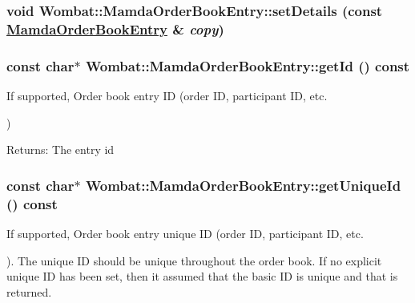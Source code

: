\hypertarget{classWombat_1_1MamdaOrderBookEntry_a0ba36b1717312d26696ef172ed2dd8b}{
\subsubsection[setDetails]{\setlength{\rightskip}{0pt plus 5cm}void Wombat::Mamda\-Order\-Book\-Entry::set\-Details (const \hyperlink{classWombat_1_1MamdaOrderBookEntry}{Mamda\-Order\-Book\-Entry} \& {\em copy})}}
\label{classWombat_1_1MamdaOrderBookEntry_a0ba36b1717312d26696ef172ed2dd8b}


\hypertarget{classWombat_1_1MamdaOrderBookEntry_1c02f6be28f007199af0108f96c829c8}{
\subsubsection[getId]{\setlength{\rightskip}{0pt plus 5cm}const char$\ast$ Wombat::Mamda\-Order\-Book\-Entry::get\-Id () const}}
\label{classWombat_1_1MamdaOrderBookEntry_1c02f6be28f007199af0108f96c829c8}


If supported, Order book entry ID (order ID, participant ID, etc. 

)

\begin{Desc}
\item[Returns:]The entry id \end{Desc}
\hypertarget{classWombat_1_1MamdaOrderBookEntry_8957ccfa3dbebb3da96905becc584220}{
\subsubsection[getUniqueId]{\setlength{\rightskip}{0pt plus 5cm}const char$\ast$ Wombat::Mamda\-Order\-Book\-Entry::get\-Unique\-Id () const}}
\label{classWombat_1_1MamdaOrderBookEntry_8957ccfa3dbebb3da96905becc584220}


If supported, Order book entry unique ID (order ID, participant ID, etc. 

). The unique ID should be unique throughout the order book. If no explicit unique ID has been set, then it assumed that the basic ID is unique and that is returned.

